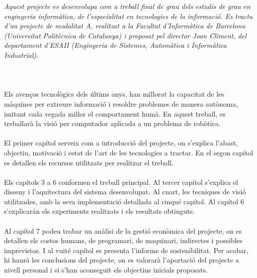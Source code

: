 \textit{Aquest projecte es desenvolupa com a treball final de grau dels estudis de grau en enginyeria informàtica, de l'especialitat en tecnologies de la informació.
Es tracta d'un projecte de modalitat A, realitzat a la Facultat d'Informàtica de Barcelona (Universitat Politècnica de Catalunya) i proposat pel director Joan Climent,
del departament d'ESAII (Enginyeria de Sistemes, Automàtica i Informàtica Industrial).}\\\\\\\\
Els avenços tecnològics dels últims anys, han millorat la capacitat de les màquines per extreure informació i resoldre problemes de manera autònoma, imitant cada vegada millor
el comportament humà. En aquest treball, es treballarà la visió per computador aplicada a un problema de robòtica.\\\\
El primer capítol serveix com a introducció del projecte, on s'explica l'abast, objectiu, motivació i estat de l'art de les tecnologies a tractar. En el segon capítol es detallen els recursos utilitzats
per realitzar el treball.\\\\
Els capítols 3 a 6 conformen el treball principal. Al tercer capítol s'explica el disseny i l'aquitectura del sistema desenvolupat. Al cuart, les tecniques de visió utilitzades, amb la seva implementació
detallada al cinqué capítol. Al capítol 6 s'explicarán els experiments realitzats i els resultats obtinguts.\\\\
Al capítol 7 podeu trobar un anàlisi de la gestió econòmica del projecte, on es detallen els costos humans, de programari, de maquinari, indirectes i possibles imprevistos. I al vuité capítol
es presenta l'informe de sostenibilitat. Per acabar, hi haurà les conclusions del projecte, on es valorarà l'aportació del projecte a nivell personal i si s'han aconseguit els objectius inicials proposats.

